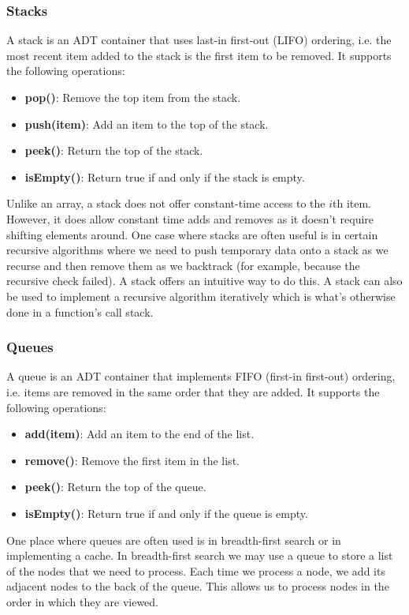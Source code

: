 \documentclass{article}
\begin{document}
    \subsubsection{Stacks}
    A stack is an ADT container that uses last-in first-out (LIFO) ordering, i.e. the most recent item added to the stack is the first item to be removed. It supports the following operations:
    \begin{itemize}
        \item  \textbf{pop()}: Remove the top item from the stack.
        \item  \textbf{push(item)}: Add an item to the top of the stack.
        \item \textbf{peek()}: Return the top of the stack.
        \item \textbf{isEmpty()}: Return true if and only if the stack is empty.
    \end{itemize}
    Unlike an array, a stack does not offer constant-time access to the $i$th item. However, it does allow constant time adds and removes as it doesn't require shifting elements around. One case where stacks are often useful is in certain recursive algorithms where we need to push temporary data onto a stack as we recurse and then remove them as we backtrack (for example, because the recursive check failed). A stack offers an intuitive way to do this. A stack can also be used to implement a recursive algorithm iteratively which is what's otherwise done in a function's call stack.
    
    \subsubsection{Queues}
    A queue is an ADT container that implements FIFO (first-in first-out) ordering, i.e. items are removed in the same order that they are added. It supports the following operations: 
    \begin{itemize}
        \item \textbf{add(item)}: Add an item to the end of the list.
        \item \textbf{remove()}: Remove the first item in the list.
        \item \textbf{peek()}: Return the top of the queue.
        \item \textbf{isEmpty()}: Return true if and only if the queue is empty. 
    \end{itemize}
    
    One place where queues are often used is in breadth-first search or in implementing a cache. In breadth-first search we may use a queue to store a list of the nodes that we need to process. Each time we process a node, we add its adjacent nodes to the back of the queue. This allows us to process nodes in the order in which they are viewed. 
    
\end{document}
